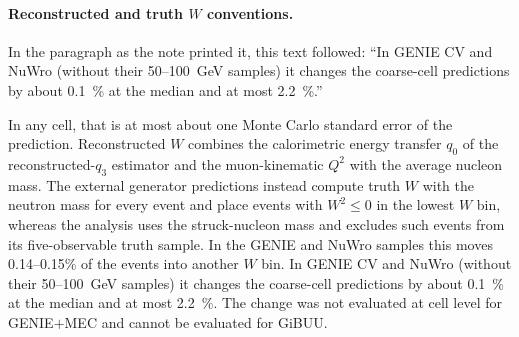 \paragraph{Reconstructed and truth $W$ conventions.} In the paragraph as the note printed it, this text followed: ``In GENIE CV and NuWro (without their 50--\SI{100}{GeV} samples) it changes the coarse-cell predictions by about \SI{0.1}{\percent} at the median and at most \SI{2.2}{\percent}.''\par In any cell, that is at most about one Monte Carlo standard error of the prediction. Reconstructed $W$ combines the calorimetric energy transfer $q_{0}$ of the reconstructed-$q_{3}$ estimator and the muon-kinematic $Q^{2}$ with the average nucleon mass. The external generator predictions instead compute truth $W$ with the neutron mass for every event and place events with $W^{2}\le0$ in the lowest $W$ bin, whereas the analysis uses the struck-nucleon mass and excludes such events from its five-observable truth sample. In the GENIE and NuWro samples this moves 0.14--0.15\% of the events into another $W$ bin. In GENIE CV and NuWro (without their 50--\SI{100}{GeV} samples) it changes the coarse-cell predictions by about \SI{0.1}{\percent} at the median and at most \SI{2.2}{\percent}. The change was not evaluated at cell level for GENIE$+$MEC and cannot be evaluated for GiBUU.

